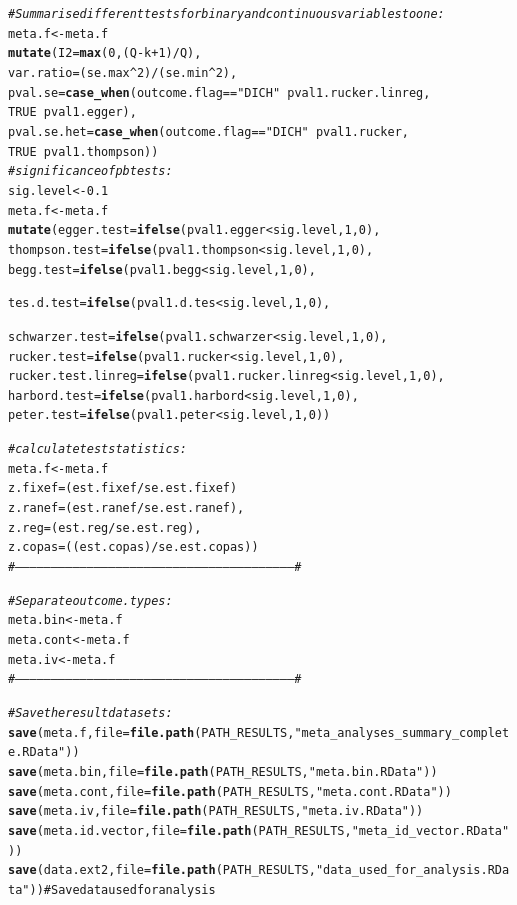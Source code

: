 \documentclass[11pt,a4paper,twoside]{book}\usepackage[]{graphicx}\usepackage[]{color}
\makeatletter
\newcommand{\hlstr}[1]{\textcolor[rgb]{0.192,0.494,0.8}{#1}}%
\newcommand{\hlcom}[1]{\textcolor[rgb]{0.678,0.584,0.686}{\textit{#1}}}%
\newcommand{\hlkwd}[1]{\textcolor[rgb]{0.737,0.353,0.396}{\textbf{#1}}}%
\newenvironment{kframe}{%
 \def\at@end@of@kframe{}%
 \ifinner\ifhmode%
  \def\at@end@of@kframe{\end{minipage}}%
  \begin{minipage}{\columnwidth}%
 \fi\fi%
 \def\FrameCommand##1{\hskip\@totalleftmargin \hskip-\fboxsep
 \colorbox{shadecolor}{##1}\hskip-\fboxsep
     \hskip-\linewidth \hskip-\@totalleftmargin \hskip\columnwidth}%
 \MakeFramed {\advance\hsize-\width
   \@totalleftmargin\z@ \linewidth\hsize
   \@setminipage}}%
 {\par\unskip\endMakeFramed%
 \at@end@of@kframe}
\newenvironment{knitrout}{}{} %
\makeatother
\begin{document}
\begin{knitrout}
\begin{kframe}
\begin{alltt}
\hlcom{#Summarise different tests for binary and continuous variables to one:}
meta.f <- meta.f %
  \hlkwd{mutate}(I2  = \hlkwd{max}(0, (Q - k + 1)/Q),
         var.ratio = (se.max^2)/(se.min^2),
         pval.se = \hlkwd{case_when}(outcome.flag == \hlstr{"DICH"} ~ pval1.rucker.linreg, 
                             TRUE ~ pval1.egger),
         pval.se.het = \hlkwd{case_when}(outcome.flag == \hlstr{"DICH"} ~ pval1.rucker, 
                                 TRUE ~ pval1.thompson))
\hlcom{#significance of pb tests:}
sig.level <- 0.1
meta.f <- meta.f %
  \hlkwd{mutate}(egger.test = \hlkwd{ifelse}(pval1.egger < sig.level, 1, 0),
         thompson.test = \hlkwd{ifelse}(pval1.thompson < sig.level, 1, 0),
         begg.test = \hlkwd{ifelse}(pval1.begg < sig.level, 1, 0),
         
         tes.d.test = \hlkwd{ifelse}(pval1.d.tes < sig.level, 1, 0),
         
         schwarzer.test = \hlkwd{ifelse}(pval1.schwarzer < sig.level, 1, 0),
         rucker.test = \hlkwd{ifelse}(pval1.rucker < sig.level, 1, 0),
         rucker.test.linreg = \hlkwd{ifelse}(pval1.rucker.linreg < sig.level, 1, 0),
         harbord.test = \hlkwd{ifelse}(pval1.harbord < sig.level, 1, 0),
         peter.test = \hlkwd{ifelse}(pval1.peter < sig.level, 1, 0))

\hlcom{#calculate test statistics:}
meta.f <- meta.f %
  z.fixef = (est.fixef/se.est.fixef)
  z.ranef = (est.ranef/se.est.ranef),
  z.reg =   (est.reg/se.est.reg),
  z.copas = ((est.copas)/se.est.copas))
\hlcom{#--------------------------------------------------------------------------------------------------------------------#}

\hlcom{#Separate outcome.types:}
meta.bin <- meta.f %
meta.cont <- meta.f %
meta.iv <- meta.f %
\hlcom{#--------------------------------------------------------------------------------------------------------------------#}

\hlcom{#Save the result datasets:}
\hlkwd{save}(meta.f, file =  \hlkwd{file.path}(PATH_RESULTS, \hlstr{"meta_analyses_summary_complete.RData"}))
\hlkwd{save}(meta.bin, file =  \hlkwd{file.path}(PATH_RESULTS, \hlstr{"meta.bin.RData"}))
\hlkwd{save}(meta.cont, file =  \hlkwd{file.path}(PATH_RESULTS, \hlstr{"meta.cont.RData"}))
\hlkwd{save}(meta.iv, file =  \hlkwd{file.path}(PATH_RESULTS, \hlstr{"meta.iv.RData"}))
\hlkwd{save}(meta.id.vector, file =  \hlkwd{file.path}(PATH_RESULTS, \hlstr{"meta_id_vector.RData"}))
\hlkwd{save}(data.ext2, file =  \hlkwd{file.path}(PATH_RESULTS, \hlstr{"data_used_for_analysis.RData"})) #Save data used for analysis





\end{alltt}
\end{kframe}
\end{knitrout}
\end{document}
